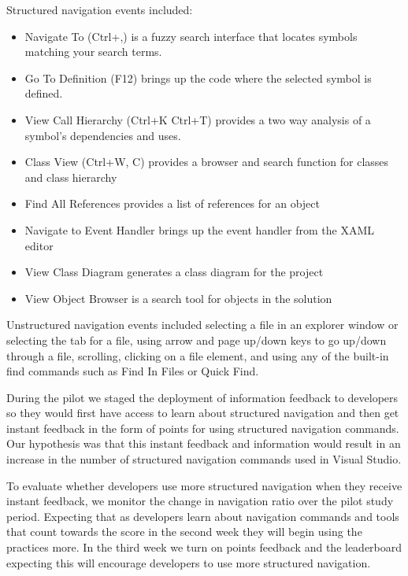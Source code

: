 \documentclass{sig-alternate}
\begin{document}
Structured navigation events included: 
\begin{itemize}[itemsep=0mm]
\item Navigate To (Ctrl+,) is a fuzzy search interface that locates symbols matching your search terms.
\item Go To Definition (F12) brings up the code where the selected symbol is defined. 
\item View Call Hierarchy (Ctrl+K Ctrl+T) provides a two way analysis of a symbol's dependencies and uses. 
\item Class View (Ctrl+W, C) provides a browser and search function for classes and class hierarchy
\item Find All References provides a list of references for an object
\item Navigate to Event Handler brings up the event handler from the XAML editor
\item View Class Diagram generates a class diagram for the project
\item View Object Browser is a search tool for objects in the solution
\end{itemize}

Unstructured navigation events included selecting a file in an explorer window or selecting the tab for a file, using arrow and page up/down keys to go up/down through a file, scrolling, clicking on a file element, and using any of the built-in find commands such as Find In Files or Quick Find.

During the pilot we staged the deployment of information feedback to developers so they would first have access to learn about structured navigation and then get instant feedback in the form of points for using structured navigation commands.  Our hypothesis was that this instant feedback and information would result in an increase in the number of structured navigation commands used in Visual Studio.

To evaluate whether developers use more structured navigation when they receive instant feedback, we monitor the change in navigation ratio over the pilot study period.   Expecting that as developers learn about navigation commands and tools that count towards the score in the second week they will begin using the practices more.  In the third week we turn on points feedback and the leaderboard expecting this will encourage developers to use more structured navigation.  
\end{document}
